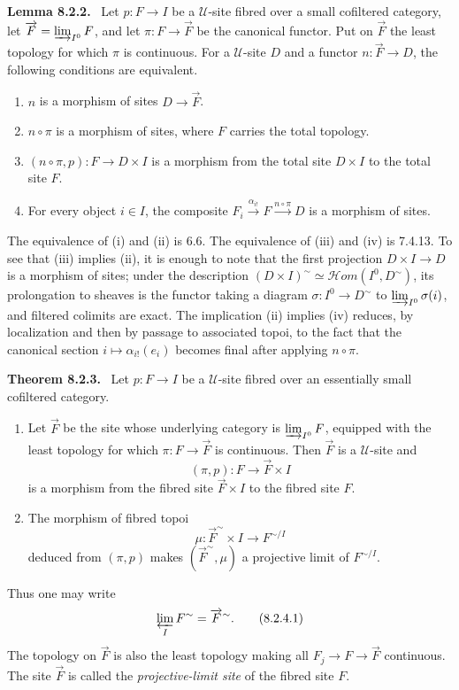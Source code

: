 \documentclass[11pt]{article}
\newcommand{\U}{\mathcal{U}}
\newenvironment{statement}[1]{\par\medskip\noindent\textbf{#1.}\ }{\par\medskip}
\begin{document}
\begin{statement}{Lemma 8.2.2}
Let \(p:F\to I\) be a \(\U\)-site fibred over a small cofiltered category, let \(\overrightarrow F=\varinjlim_{I^0}F\), and let \(\pi:F\to\overrightarrow F\) be the canonical functor. Put on \(\overrightarrow F\) the least topology for which \(\pi\) is continuous. For a \(\U\)-site \(D\) and a functor \(n:\overrightarrow F\to D\), the following conditions are equivalent.

\begin{enumerate}[label=\roman*)]
\item \(n\) is a morphism of sites \(D\to\overrightarrow F\).
\item \(n\circ\pi\) is a morphism of sites, where \(F\) carries the total topology.
\item \((n\circ\pi,p):F\to D\times I\) is a morphism from the total site \(D\times I\) to the total site \(F\).
\item For every object \(i\in I\), the composite \(F_i\xrightarrow{\alpha_{i!}}F\xrightarrow{n\circ\pi}D\) is a morphism of sites.
\end{enumerate}
\end{statement}
The equivalence of (i) and (ii) is 6.6. The equivalence of (iii) and (iv) is 7.4.13. To see that (iii) implies (ii), it is enough to note that the first projection \(D\times I\to D\) is a morphism of sites; under the description \((D\times I)^\sim\simeq\mathcal{H}om(I^0,D^\sim)\), its prolongation to sheaves is the functor taking a diagram \(\sigma:I^0\to D^\sim\) to \(\varinjlim_{I^0}\sigma(i)\), and filtered colimits are exact. The implication (ii) implies (iv) reduces, by localization and then by passage to associated topoi, to the fact that the canonical section \(i\mapsto\alpha_{i!}(e_i)\) becomes final after applying \(n\circ\pi\).

\begin{statement}{Theorem 8.2.3}
Let \(p:F\to I\) be a \(\U\)-site fibred over an essentially small cofiltered category.
\begin{enumerate}[label=\arabic*)]
\item Let \(\overrightarrow F\) be the site whose underlying category is \(\varinjlim_{I^0}F\), equipped with the least topology for which \(\pi:F\to\overrightarrow F\) is continuous. Then \(\overrightarrow F\) is a \(\U\)-site and
\[
 (\pi,p):F\to\overrightarrow F\times I
\]
is a morphism from the fibred site \(\overrightarrow F\times I\) to the fibred site \(F\).
\item The morphism of fibred topoi
\[
 \mu:\overrightarrow F^{\sim}\times I\to F^{\sim/I}
\]
deduced from \((\pi,p)\) makes \((\overrightarrow F^{\sim},\mu)\) a projective limit of \(F^{\sim/I}\).
\end{enumerate}
\end{statement}
Thus one may write
\[
 \varprojlim_I F^{\sim} = \overrightarrow F^{\sim}. \tag{8.2.4.1}
\]
The topology on \(\overrightarrow F\) is also the least topology making all \(F_j\to F\to\overrightarrow F\) continuous. The site \(\overrightarrow F\) is called the \emph{projective-limit site} of the fibred site \(F\).
\end{document}
